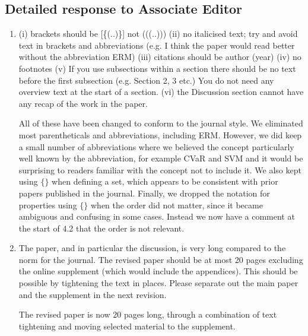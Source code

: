 \documentclass[a4paper]{article}
\begin{document}
\subsection*{Detailed response to Associate Editor}

\begin{enumerate}

\item (i) brackets should be [\{(..)\}] not (((..)))
(ii) no italicised text; try and avoid text in brackets and abbreviations (e.g. I think the paper would read better without the abbreviation ERM)
(iii) citations should be author (year)
(iv) no footnotes
(v) If you use subsections within a section there should be no text before the first subsection (e.g. Section 2, 3 etc.) You do not need any overview text at the start of a section.
(vi) the Discussion section cannot have any recap of the work in the paper.

All of these have been changed to conform to the journal style.  We eliminated most parentheticals and abbreviations, including ERM.  However, we did keep a small number of abbreviations where we believed the concept particularly well known by the abbreviation, for example CVaR and SVM and it would be surprising to readers familiar with the concept not to include it.  We also kept using $\{\}$ when defining a set, which appears to be consistent with prior papers published in the journal.  Finally, we dropped the notation for properties using $\{\}$ when the order did not matter, since it became ambiguous and confusing in some cases.  Instead we now have a comment at the start of 4.2 that the order is not relevant.

\item The paper, and in particular the discussion, is very long compared to the norm for the journal. The revised paper should be at most 20 pages excluding the online supplement (which would include the appendices). This should be possible by tightening the text in places. Please separate out the main paper and the supplement in the next revision.

The revised paper is now 20 pages long, through a combination of text tightening and moving selected material to the supplement.

\end{enumerate}
\end{document}
